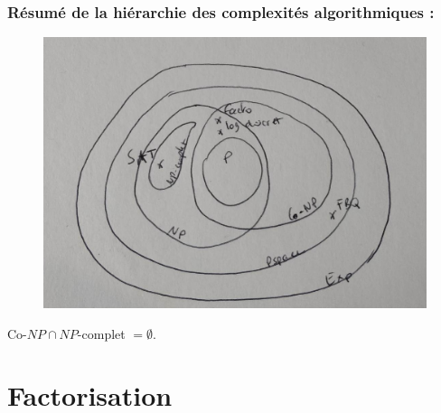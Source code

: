             \subsubsection{Résumé de la hiérarchie des complexités algorithmiques :}
                \begin{figure}[H]
                    \centering
                    \includegraphics[width=.5\textwidth]{02}
                \end{figure}
                \begin{remq}
                    Co-$NP \cap NP$-complet $= \emptyset$.
                \end{remq}

    \section{Factorisation}
